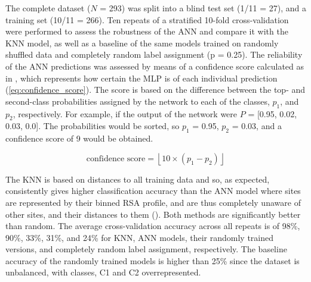 The complete dataset ($N$ = 293) was split into a blind test set (1/11 = 27), and a training set (10/11 = 266). Ten repeats of a stratified 10-fold cross-validation were performed to assess the robustness of the ANN and compare it with the KNN model, as well as a baseline of the same models trained on randomly shuffled data and completely random label assignment (p = 0.25). The reliability of the ANN predictions was assessed by means of a confidence score calculated as in \cite{CUFF_2000_PROFILES}, which represents how certain the MLP is of each individual prediction (\autoref{eq:confidence_score}). The score is based on the difference between the top- and second-class probabilities assigned by the network to each of the classes, $p_{1}$, and $p_{2}$, respectively. For example, if the output of the network were $P$ = [0.95, 0.02, 0.03, 0.0]. The probabilities would be sorted, so $p_{1}$ = 0.95, $p_{2}$ = 0.03, and a confidence score of 9 would be obtained.

\begin{equation}
\text{confidence score} = \left\lfloor 10 \times (p_1 - p_2) \right\rfloor
\label{eq:confidence_score}
\end{equation}

The KNN is based on distances to all training data and so, as expected, consistently gives higher classification accuracy than the ANN model where sites are represented by their binned RSA profile, and are thus completely unaware of other sites, and their distances to them (). Both methods are significantly better than random. The average cross-validation accuracy across all repeats is of 98\%, 90\%, 33\%, 31\%, and 24\% for KNN, ANN models, their randomly trained versions, and completely random label assignment, respectively. The baseline accuracy of the randomly trained models is higher than 25\% since the dataset is unbalanced, with classes, C1 and C2 overrepresented.

